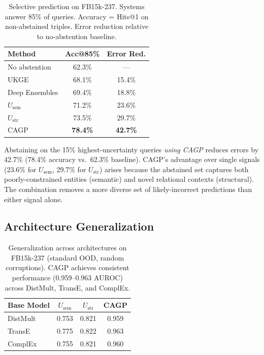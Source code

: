 \documentclass{article}
\begin{document}
\begin{table}[ht]
\centering
\caption{Selective prediction on FB15k-237. Systems answer 85\% of queries. Accuracy = Hits@1 on non-abstained triples. Error reduction relative to no-abstention baseline.}
\begin{tabular}{lcc}
\toprule
Method & Acc@85\% & Error Red. \\
\midrule
No abstention & 62.3\% & --- \\
UKGE & 68.1\% & 15.4\% \\
Deep Ensembles & 69.4\% & 18.8\% \\
$U_{\text{sem}}$ & 71.2\% & 23.6\% \\
$U_{\text{str}}$ & 73.5\% & 29.7\% \\
CAGP & \textbf{78.4\%} & \textbf{42.7\%} \\
\bottomrule
\end{tabular}
\end{table}

Abstaining on the 15\% highest-uncertainty queries \emph{using CAGP} reduces errors by 42.7\% (78.4\% accuracy vs.\ 62.3\% baseline). CAGP's advantage over single signals (23.6\% for $U_{\text{sem}}$, 29.7\% for $U_{\text{str}}$) arises because the abstained set captures both poorly-constrained entities (semantic) and novel relational contexts (structural). The combination removes a more diverse set of likely-incorrect predictions than either signal alone.

\subsection{Architecture Generalization}
\label{app:architectures}

\begin{table}[ht]
\centering
\caption{Generalization across architectures on FB15k-237 (standard OOD, random corruptions). CAGP achieves consistent performance (0.959--0.963 AUROC) across DistMult, TransE, and ComplEx.}
\begin{tabular}{lccc}
\toprule
Base Model & $U_{\text{sem}}$ & $U_{\text{str}}$ & CAGP \\
\midrule
DistMult & 0.753 & 0.821 & 0.959 \\
TransE & 0.775 & 0.822 & 0.963 \\
ComplEx & 0.755 & 0.821 & 0.960 \\
\bottomrule
\end{tabular}
\end{table}
\end{document}
